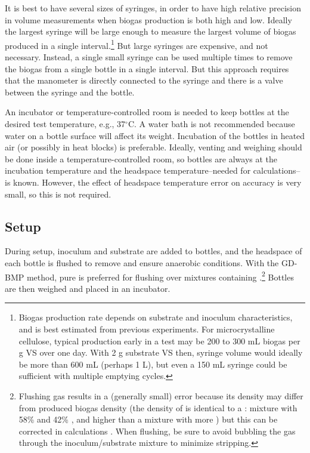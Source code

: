 \documentclass[]{article}
\begin{document}
It is best to have several sizes of syringes, in order to have high relative precision in volume measurements when biogas production is both high and low.
Ideally the largest syringe will be large enough to measure the largest volume of biogas produced in a single interval.\footnote{
  Biogas production rate depends on substrate and inoculum characteristics, and is best estimated from previous experiments.
  For microcrystalline cellulose, typical production early in a test may be 200 to 300 mL biogas per g VS over one day. 
  With 2 g substrate VS then, syringe volume would ideally be more than 600 mL (perhaps 1 L), but even a 150 mL syringe could be sufficient with multiple emptying cycles.
}
But large syringes are expensive, and not necessary.
Instead, a single small syringe can be used multiple times to remove the biogas from a single bottle in a single interval.
But this approach requires that the manometer is directly connected to the syringe and there is a valve between the syringe and the bottle.

An incubator or temperature-controlled room is needed to keep bottles at the desired test temperature, e.g., 37$^\circ$C.
A water bath is not recommended because water on a bottle surface will affect its weight.
Incubation of the bottles in heated air (or possibly in heat blocks) is preferable.
Ideally, venting and weighing should be done inside a temperature-controlled room, so bottles are always at the incubation temperature and the headspace temperature--needed for calculations--is known.  
However, the effect of headspace temperature error on accuracy is very small, so this is not required.

\subsection{Setup}
During setup, inoculum and substrate are added to bottles, and the headspace of each bottle is flushed to remove  and ensure anaerobic conditions. 
With the GD-BMP method, pure  is preferred for flushing over mixtures containing .\footnote{
  Flushing gas results in a (generally small) error because its density may differ from produced biogas density (the density of  is identical to a : mixture with 58\%  and 42\% , and higher than a mixture with more ) but this can be corrected in calculations \citep{justesenDevelopmentValidationLowcost2019}. 
When flushing, be sure to avoid bubbling the gas through the inoculum/substrate mixture to minimize  stripping.
}
Bottles are then weighed and placed in an incubator.
\end{document}
